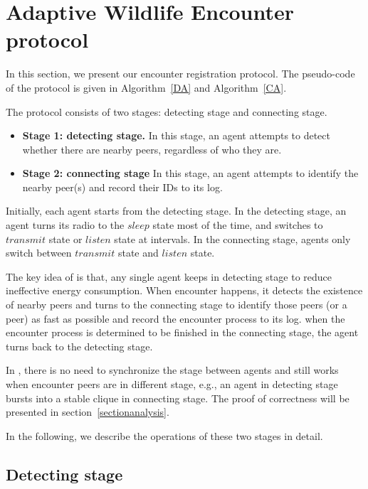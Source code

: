 \section{Adaptive Wildlife Encounter protocol}
\label{sectionprotocol}

In this section, we present our encounter registration protocol.
The pseudo-code of the protocol is given in Algorithm~\ref{DA} and Algorithm~\ref{CA}.

The protocol consists of two stages: detecting stage and connecting stage. 
\begin{itemize}
    \item \textbf{Stage 1: detecting stage.} In this stage, an agent attempts to
    detect whether there are nearby peers, regardless of who they are. 
    \item \textbf{Stage 2: connecting stage} In this stage, an agent attempts to 
    identify the nearby peer(s) and record their IDs to its log.
\end{itemize}

Initially, each agent starts from the detecting stage. 
In the detecting stage, an agent turns its radio to the $sleep$ state most of the time,
and switches to $transmit$ state or $listen$ state at intervals.
In the connecting stage, agents only switch between $transmit$ state 
and $listen$ state.

The key idea of {\pName} is that, any single agent keeps in detecting 
stage to reduce ineffective energy consumption. When encounter happens, 
it detects the existence of nearby peers and turns to the connecting stage 
to identify those peers (or a peer) as fast as possible and record the encounter process to its log. 
when the encounter process is determined to be finished in the connecting stage, 
the agent turns back to the detecting stage.

\begin{remark}
    In {\pName}, there is no need to synchronize the stage between agents and
    {\pName} still works when encounter peers are in different stage, e.g., an agent in detecting 
    stage bursts into a stable clique in connecting stage. 
    The proof of correctness will be presented 
    in section~\ref{sectionanalysis}. 
\end{remark}

In the following, we describe the operations of these two stages in detail. 

\subsection{Detecting stage}

